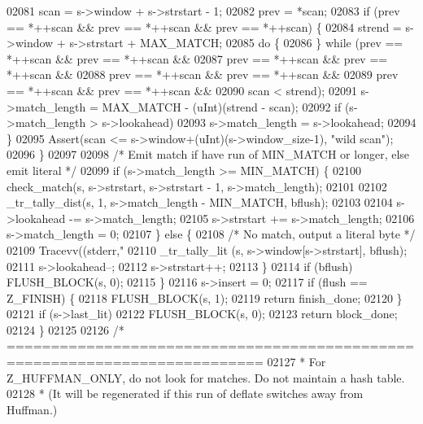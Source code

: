\begin{DoxyCode}
{{{{{{{{02081             scan = s->window + s->strstart - 1;
02082             prev = *scan;
02083             \textcolor{keywordflow}{if} (prev == *++scan && prev == *++scan && prev == *++scan) \{
02084                 strend = s->window + s->strstart + MAX\_MATCH;
02085                 \textcolor{keywordflow}{do} \{
02086                 \} \textcolor{keywordflow}{while} (prev == *++scan && prev == *++scan &&
02087                          prev == *++scan && prev == *++scan &&
02088                          prev == *++scan && prev == *++scan &&
02089                          prev == *++scan && prev == *++scan &&
02090                          scan < strend);
02091                 s->match\_length = MAX\_MATCH - (uInt)(strend - scan);
02092                 \textcolor{keywordflow}{if} (s->match\_length > s->lookahead)
02093                     s->match\_length = s->lookahead;
02094             \}
02095             Assert(scan <= s->window+(uInt)(s->window\_size-1), \textcolor{stringliteral}{"wild scan"});
02096         \}
02097 
02098         \textcolor{comment}{/* Emit match if have run of MIN\_MATCH or longer, else emit literal */}
02099         \textcolor{keywordflow}{if} (s->match\_length >= MIN\_MATCH) \{
02100             check\_match(s, s->strstart, s->strstart - 1, s->match\_length);
02101 
02102             \_tr\_tally\_dist(s, 1, s->match\_length - MIN\_MATCH, bflush);
02103 
02104             s->lookahead -= s->match\_length;
02105             s->strstart += s->match\_length;
02106             s->match\_length = 0;
02107         \} \textcolor{keywordflow}{else} \{
02108             \textcolor{comment}{/* No match, output a literal byte */}
02109             Tracevv((stderr,\textcolor{stringliteral}{"%
02110             \_tr\_tally\_lit (s, s->window[s->strstart], bflush);
02111             s->lookahead--;
02112             s->strstart++;
02113         \}
02114         \textcolor{keywordflow}{if} (bflush) FLUSH\_BLOCK(s, 0);
02115     \}
02116     s->insert = 0;
02117     \textcolor{keywordflow}{if} (flush == Z\_FINISH) \{
02118         FLUSH\_BLOCK(s, 1);
02119         \textcolor{keywordflow}{return} finish\_done;
02120     \}
02121     \textcolor{keywordflow}{if} (s->last\_lit)
02122         FLUSH\_BLOCK(s, 0);
02123     \textcolor{keywordflow}{return} block\_done;
02124 \}
02125 
02126 \textcolor{comment}{/* ===========================================================================}
02127 \textcolor{comment}{ * For Z\_HUFFMAN\_ONLY, do not look for matches.  Do not maintain a hash table.}
02128 \textcolor{comment}{ * (It will be regenerated if this run of deflate switches away from Huffman.)}
}}}}}}}}}
\end{DoxyCode}
